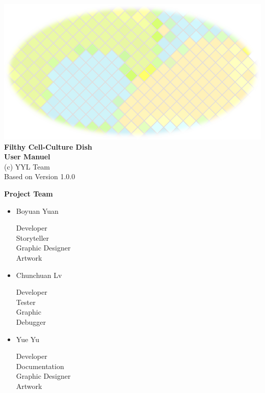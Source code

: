 \documentclass[12pt,a4paper]{scrartcl}
\date{}
\begin{document}
\begin{center}
\thispagestyle{empty}
\vfill
\includegraphics[scale=1]{title2}
\vfill
\huge
	\textbf{Filthy Cell-Culture Dish\\
	User Manuel\\}
\vfill
\large
	(c) YYL Team\\
	Based on Version 1.0.0
\vfill
\end{center}

\clearpage

\large
\textbf{Project Team}
\begin{itemize}
	\item Boyuan Yuan
	\begin{flushright}
		Developer\\
		Storyteller\\
		Graphic Designer\\
		Artwork\\
	\end{flushright}
	
	\item Chunchuan Lv
	\begin{flushright}	
		Developer\\
		Tester\\
		Graphic\\
		Debugger\\
	\end{flushright}
	
	\item Yue Yu
	\begin{flushright}
		Developer\\
		Documentation\\
		Graphic Designer\\
		Artwork\\
	\end{flushright}
\end{itemize}
\clearpage
\end{document}
